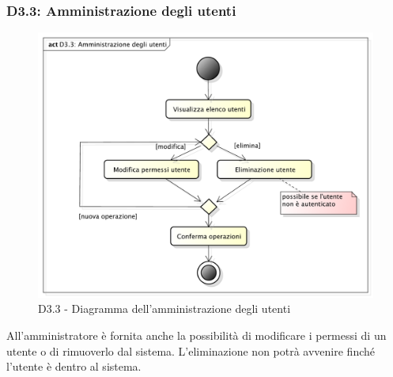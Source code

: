 		\pagebreak

		\subsubsection{D3.3: Amministrazione degli utenti} %
		\label{ssub:amministrazione_degli_utenti}
		\begin{figure}[!htbp]
			\centering
			\centerline{\includegraphics[scale=0.45]{./images/D3_3.pdf}}
			\caption{D3.3 - Diagramma dell'amministrazione degli utenti}
		\end{figure}
		\noindent
		All'amministratore è fornita anche la possibilità di modificare i permessi di un utente o di rimuoverlo dal sistema. L'eliminazione non potrà avvenire finché l'utente è dentro al sistema.





